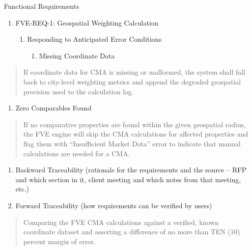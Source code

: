 \documentclass[
]{article}
\begin{document}
Functional Requirements

\begin{enumerate}
\def\labelenumi{\Roman{enumi})}
\item
  FVE-REQ-1: Geospatial Weighting Calculation

  \begin{enumerate}
  \def\labelenumii{\alph{enumii}.}
  \item
    Responding to Anticipated Error Conditions

    \begin{enumerate}
    \def\labelenumiii{\roman{enumiii}.}
    \item
      Missing Coordinate Data
    \end{enumerate}
  \end{enumerate}
\end{enumerate}

\begin{quote}
If coordinate data for CMA is missing or malformed, the system shall
fall back to city-level weighting metrics and append the degraded
geospatial precision used to the calculation log.
\end{quote}

\begin{enumerate}
\def\labelenumi{\roman{enumi}.}
\setcounter{enumi}{1}
\item
  Zero Comparables Found
\end{enumerate}

\begin{quote}
If no comparative properties are found within the given geospatial
radius, the FVE engine will skip the CMA calculations for affected
properties and flag them with ``Insufficient Market Data'' error to
indicate that manual calculations are needed for a CMA.
\end{quote}

\begin{enumerate}
\def\labelenumi{\alph{enumi}.}
\setcounter{enumi}{1}
\item
  Backward Traceability (rationale for the requirements and the source
  -- RFP and which section in it, client meeting and which notes from
  that meeting, etc.)
\item
  Forward Traceability (how requirements can be verified by users)
\end{enumerate}

\begin{quote}
Comparing the FVE CMA calculations against a verified, known coordinate
dataset and asserting a difference of no more than TEN (10) percent
margin of error.
\end{quote}
\end{document}
